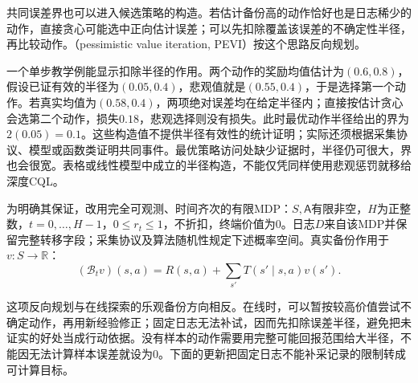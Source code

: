 共同误差界也可以进入候选策略的构造。若估计备份高的动作恰好也是日志稀少的动作，直接贪心可能选中正向估计误差；可以先扣除覆盖该误差的不确定性半径，再比较动作。（pessimistic value iteration, PEVI）按这个思路反向规划。

一个单步教学例能显示扣除半径的作用。两个动作的奖励均值估计为$(0.6,0.8)$，假设已证有效的半径为$(0.05,0.4)$，悲观值就是$(0.55,0.4)$，于是选择第一个动作。若真实均值为$(0.58,0.4)$，两项绝对误差均在给定半径内；直接按估计贪心会选第二个动作，损失$0.18$，悲观选择则没有损失。此时最优动作半径给出的界为$2(0.05)=0.1$。这些构造值不提供半径有效性的统计证明；实际还须根据采集协议、模型或函数类证明共同事件。最优策略访问处缺少证据时，半径仍可很大，界也会很宽。表格或线性模型中成立的半径构造，不能仅凭同样使用悲观惩罚就移给深度CQL。

为明确其保证，改用完全可观测、时间齐次的有限MDP：$S,\mathsf A$有限非空，$H$为正整数，$t=0,\ldots,H-1$，$0\leq r_t\leq1$，不折扣，终端价值为0。日志$D$来自该MDP并保留完整转移字段；采集协议及算法随机性规定下述概率空间。真实备份作用于$v:S\to\mathbb R$：
\[
  (\mathcal B_t v)(s,a)
    =R(s,a)+\sum_{s'}T(s'\mid s,a)v(s').
\]

这项反向规划与在线探索的乐观备份方向相反。在线时，可以暂按较高价值尝试不确定动作，再用新经验修正；固定日志无法补试，因而先扣除误差半径，避免把未证实的好处当成行动依据。没有样本的动作需要用完整可能回报范围给大半径，不能因无法计算样本误差就设为0。下面的更新把固定日志不能补采记录的限制转成可计算目标。

